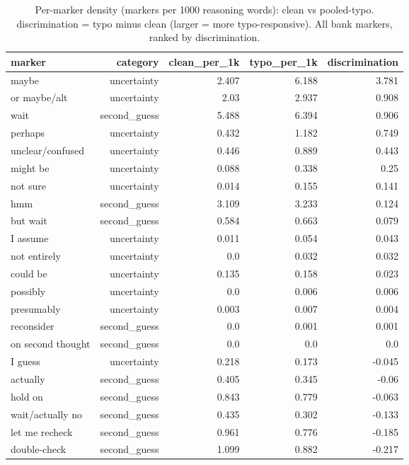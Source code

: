 \documentclass[11pt]{article}
\begin{document}
\begin{table}[H]
\centering
\caption{Per-marker density (markers per 1000 reasoning words): clean vs pooled-typo. discrimination = typo minus clean (larger = more typo-responsive). All bank markers, ranked by discrimination.}
\small
\begin{adjustbox}{max width=\textwidth}
\begin{tabular}{lrrrr}
\toprule
\textbf{marker} & \textbf{category} & \textbf{clean\_per\_1k} & \textbf{typo\_per\_1k} & \textbf{discrimination} \\
\midrule
maybe & uncertainty & 2.407 & 6.188 & 3.781 \\
or maybe/alt & uncertainty & 2.03 & 2.937 & 0.908 \\
wait & second\_guess & 5.488 & 6.394 & 0.906 \\
perhaps & uncertainty & 0.432 & 1.182 & 0.749 \\
unclear/confused & uncertainty & 0.446 & 0.889 & 0.443 \\
might be & uncertainty & 0.088 & 0.338 & 0.25 \\
not sure & uncertainty & 0.014 & 0.155 & 0.141 \\
hmm & second\_guess & 3.109 & 3.233 & 0.124 \\
but wait & second\_guess & 0.584 & 0.663 & 0.079 \\
I assume & uncertainty & 0.011 & 0.054 & 0.043 \\
not entirely & uncertainty & 0.0 & 0.032 & 0.032 \\
could be & uncertainty & 0.135 & 0.158 & 0.023 \\
possibly & uncertainty & 0.0 & 0.006 & 0.006 \\
presumably & uncertainty & 0.003 & 0.007 & 0.004 \\
reconsider & second\_guess & 0.0 & 0.001 & 0.001 \\
on second thought & second\_guess & 0.0 & 0.0 & 0.0 \\
I guess & uncertainty & 0.218 & 0.173 & -0.045 \\
actually & second\_guess & 0.405 & 0.345 & -0.06 \\
hold on & second\_guess & 0.843 & 0.779 & -0.063 \\
wait/actually no & second\_guess & 0.435 & 0.302 & -0.133 \\
let me recheck & second\_guess & 0.961 & 0.776 & -0.185 \\
double-check & second\_guess & 1.099 & 0.882 & -0.217 \\
\bottomrule
\end{tabular}
\end{adjustbox}
\end{table}
\end{document}
